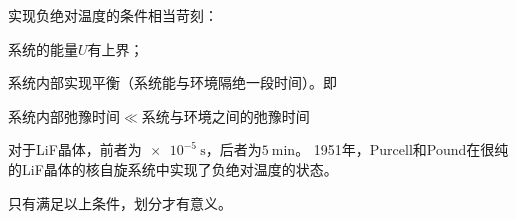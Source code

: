 \begin{remark}
	实现负绝对温度的条件相当苛刻：
	\begin{compactenum}
		\item 系统的能量$U$有上界；
		\item 系统内部实现平衡（系统能与环境隔绝一段时间）。即
		\begin{center}
			系统内部弛豫时间$\ll$系统与环境之间的弛豫时间
		\end{center}
		对于LiF晶体，前者为$\qty{e-5}{\second}$，后者为$\qty{5}{\minute}$。
		1951年，Purcell和Pound在很纯的LiF晶体的核自旋系统中实现了负绝对温度的状态。
	\end{compactenum}
	只有满足以上条件，划分才有意义。
\end{remark}

